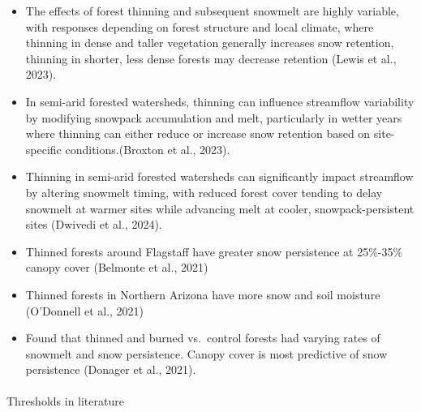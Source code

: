 \documentclass[
]{agujournal2019}
\makeatletter
\let\oldparagraph\paragraph
\renewcommand{\paragraph}{
    \@ifstar
      \xxxParagraphStar
      \xxxParagraphNoStar
  }
\newcommand{\xxxParagraphStar}[1]{\oldparagraph*{#1}\mbox{}}
\newcommand{\xxxParagraphNoStar}[1]{\oldparagraph{#1}\mbox{}}
\makeatother
\begin{document}
\begin{itemize}
\item
  The effects of forest thinning and subsequent snowmelt are highly
  variable, with responses depending on forest structure and local
  climate, where thinning in dense and taller vegetation generally
  increases snow retention, thinning in shorter, less dense forests may
  decrease retention (Lewis et al., 2023).
\item
  In semi-arid forested watersheds, thinning can influence streamflow
  variability by modifying snowpack accumulation and melt, particularly
  in wetter years where thinning can either reduce or increase snow
  retention based on site-specific conditions.(Broxton et al., 2023).
\item
  Thinning in semi-arid forested watersheds can significantly impact
  streamflow by altering snowmelt timing, with reduced forest cover
  tending to delay snowmelt at warmer sites while advancing melt at
  cooler, snowpack-persistent sites (Dwivedi et al., 2024).
\item
  Thinned forests around Flagstaff have greater snow persistence at
  25\%-35\% canopy cover (Belmonte et al., 2021)
\item
  Thinned forests in Northern Arizona have more snow and soil moisture
  (O'Donnell et al., 2021)
\item
  Found that thinned and burned vs.~control forests had varying rates of
  snowmelt and snow persistence. Canopy cover is most predictive of snow
  persistence (Donager et al., 2021).
\end{itemize}

\paragraph{Thresholds in literature}\label{thresholds-in-literature}
\end{document}
